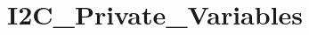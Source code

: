 \hypertarget{group___i2_c___private___variables}{\section{I2\-C\-\_\-\-Private\-\_\-\-Variables}
\label{group___i2_c___private___variables}
}
